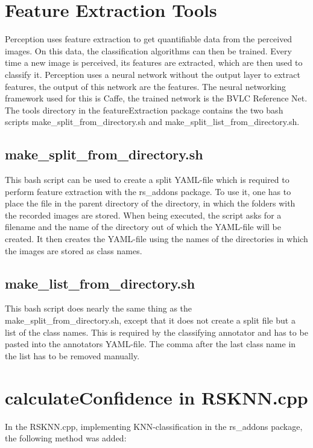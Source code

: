 \documentclass[main.tex]{subfiles}
\begin{document}
\section{Feature Extraction Tools}
Perception uses feature extraction to get quantifiable data from the perceived images. On this data, the classification algorithms can then be trained. Every time a new image is perceived, its features are extracted, which are then used to classify it. Perception uses a neural network without the output layer to extract features, the output of this network are the features. The neural networking framework used for this is Caffe, the trained network is the BVLC Reference Net. The tools directory in the featureExtraction package contains the two bash scripts make\_split\_from\_directory.sh and make\_split\_list\_from\_directory.sh.

\subsection{make\_split\_from\_directory.sh} 
This bash script can be used to create a split YAML-file which is required to perform feature extraction with the rs\_addons package. To use it, one has to place the file in the parent directory of the directory, in which the folders with the recorded images are stored. When being executed, the script asks for a filename and the name of the directory out of which the YAML-file will be created. It then creates the YAML-file using the names of the directories in which the images are stored as class names.

\subsection{make\_list\_from\_directory.sh}
This bash script does nearly the same thing as the make\_split\_from\_directory.sh, except that it does not create a split file but a list of the class names. This is required by the classifying annotator and has to be pasted into the annotators YAML-file. The comma after the last class name in the list has to be removed manually.

\section{calculateConfidence in RSKNN.cpp}
In the RSKNN.cpp, implementing KNN-classification in the rs\_addons package, the following method was added:
\end{document}
